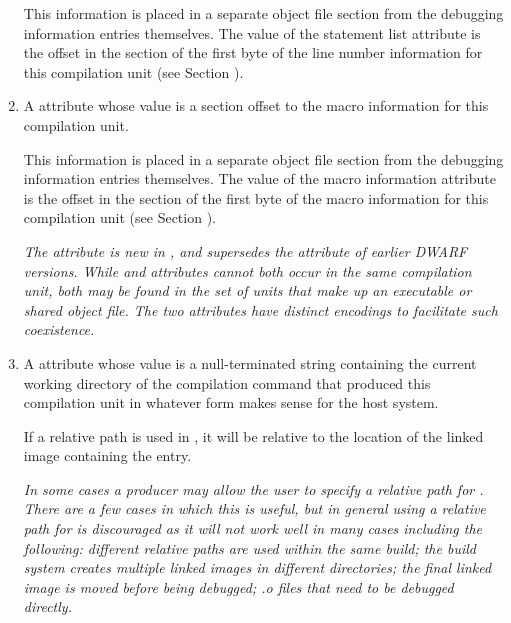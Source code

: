 \begin{enumerate}[1. ]
This information is placed in a separate object file
section from the debugging information entries themselves. The
value of the statement list attribute is the offset in the
\dotdebugline{} section of the first byte of the line number
information for this compilation unit 
(see Section ).

\item A \DWATmacrosDEFN{}\hypertarget{chap:DWATmacrosmacroinformation}{}
attribute 
whose value is a 
section offset to the macro information for this compilation unit.

This information is placed in a separate object file section
from the debugging information entries themselves. The
value of the macro information attribute is the offset in
the \dotdebugmacro{} section of the first byte of the macro
information for this compilation unit 
(see Section ).

\textit{The \DWATmacrosNAME{} attribute is new in \DWARFVersionV, 
and supersedes the 
\DWATmacroinfoDEFN{} attribute of earlier DWARF versions.
While \DWATmacrosNAME{} and \DWATmacroinfoNAME{} attributes cannot 
both occur in the same compilation unit, both may be found in the 
set of units that make up an executable or shared object file. 
The two attributes have distinct encodings to facilitate such
coexistence.}

\item  \hypertarget{chap:DWATcompdircompilationdirectory}{}
A \DWATcompdirDEFN{} attribute 
whose value is a
null-terminated string containing the current working directory
of the compilation command that produced this compilation
unit in whatever form makes sense for the host system.

\bb
If a relative path is used in \DWATcompdirNAME, it will be relative 
to the location of the linked image containing the \DWATcompdirNAME{}
entry.

\textit{In some cases a producer may allow the user to specify a relative
path for \DWATcompdir. There are a few cases in which this is useful,
but in general using a relative path for \DWATcompdir{} is discouraged
as it will not work well in many cases including the following:
different relative paths are used within the same build; the build
system creates multiple linked images in different directories; the
final linked image is moved before being debugged; .o files that need to
be debugged directly.}
\eb


\end{enumerate}
